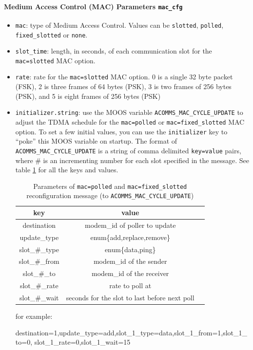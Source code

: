 \documentclass[11pt, letterpaper, oneside]{memoir}
\begin{document}
\paragraph{Medium Access Control (MAC) Parameters \texttt{mac\_cfg}}
\begin{itemize}
\item \verb|mac|: type of Medium Access Control. Values can be \verb|slotted|, \verb|polled|, \verb|fixed_slotted| or \verb|none|.
\item \verb|slot_time|: length, in seconds, of each communication slot for the \verb|mac=slotted| MAC option.
\item \verb|rate|: rate for the \verb|mac=slotted| MAC option. 0 is a single 32 byte packet (FSK), 2 is three frames of 64 bytes (PSK), 3 is two frames of 256 bytes (PSK), and 5 is eight frames of 256 bytes (PSK)
\item \verb|initializer.string|: use the MOOS variable \verb|ACOMMS_MAC_CYCLE_UPDATE| to adjust the TDMA schedule for the  \verb|mac=polled| or \verb|mac=fixed_slotted| MAC option. To set a few initial values, you can use the \verb|initializer| key to ``poke'' this MOOS variable on startup. The format of \verb|ACOMMS_MAC_CYCLE_UPDATE| is a string of comma delimited \verb|key=value| pairs, where \# is an incrementing number for each slot specified in the message. See table \ref{tab:pAcommsHandler:poll} for all the keys and values.

\begin{table}
\centering
\footnotesize
\begin{tabular}{|c|c|c|}
\hline key & value \\ \hline
\hline destination & modem\_id of poller to update  \\ 
\hline update\_type & enum\{add,replace,remove\}  \\ 
\hline slot\_\#\_type & enum\{data,ping\} \\ 
\hline slot\_\#\_from & modem\_id of the sender  \\ 
\hline slot\_\#\_to & modem\_id of the receiver  \\ 
\hline slot\_\#\_rate & rate to poll at  \\ 
\hline slot\_\#\_wait & seconds for the slot to last before next poll \\ 
\hline 
\end{tabular} 
\caption{Parameters of \texttt{mac=polled} and \texttt{mac=fixed\_slotted} reconfiguration message (to \texttt{ACOMMS\_MAC\_CYCLE\_UPDATE})} \label{tab:pAcommsHandler:poll}
\end{table}

for example:
\begin{small}
\begin{boxedverbatim}
destination=1,update_type=add,slot_1_type=data,slot_1_from=1,slot_1_to=0,
slot_1_rate=0,slot_1_wait=15
\end{boxedverbatim}
\resetbvlinenumber
\end{small}

\end{itemize} 
\end{document}
